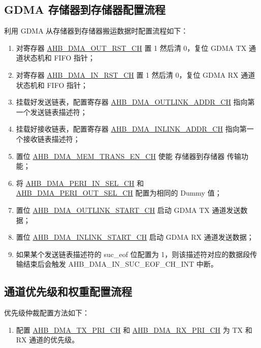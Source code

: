 \documentclass[main\_\_CN.tex]{subfiles}
\begin{document}
\subsection{GDMA 存储器到存储器配置流程}
利用 GDMA 从存储器到存储器搬运数据时配置流程如下：
\begin{enumerate}
    \item 对寄存器 \hyperref[fielddesc:AHBDMAOUTRSTCHN]{AHB\_DMA\_OUT\_RST\_CH} 置 1 然后清 0，复位 GDMA TX 通道状态机和 FIFO 指针；
    \item 对寄存器 \hyperref[fielddesc:AHBDMAINRSTCHN]{AHB\_DMA\_IN\_RST\_CH} 置 1 然后清 0，复位 GDMA RX 通道状态机和 FIFO 指针；
    \item 挂载好发送链表，配置寄存器 \hyperref[fielddesc:AHBDMAOUTLINKADDRCHN]{AHB\_DMA\_OUTLINK\_ADDR\_CH} 指向第一个发送链表描述符；
    \item 挂载好接收链表，配置寄存器 \hyperref[fielddesc:AHBDMAINLINKADDRCHN]{AHB\_DMA\_INLINK\_ADDR\_CH} 指向第一个接收链表描述符；
    \item 置位 \hyperref[fielddesc:AHBDMAMEMTRANSENCHN]{AHB\_DMA\_MEM\_TRANS\_EN\_CH} 使能 存储器到存储器 传输功能；
    \item 将 \hyperref[fielddesc:AHBDMAPERIINSELCHN]{AHB\_DMA\_PERI\_IN\_SEL\_CH} 和 \hyperref[fielddesc:AHBDMAPERIOUTSELCHN]{AHB\_DMA\_PERI\_OUT\_SEL\_CH} 配置为相同的 Dummy 值；
    \item 置位 \hyperref[fielddesc:AHBDMAOUTLINKSTARTCHN]{AHB\_DMA\_OUTLINK\_START\_CH} 启动 GDMA TX 通道发送数据；
    \item 置位 \hyperref[fielddesc:AHBDMAINLINKSTARTCHN]{AHB\_DMA\_INLINK\_START\_CH} 启动 GDMA RX 通道发送数据；
    \item 如果某个发送链表描述符的 suc\_eof 位配置为 1，则该描述符对应的数据段传输结束后会触发 AHB\_DMA\_IN\_SUC\_EOF\_CH\_INT 中断。
\end{enumerate}

\subsection{通道优先级和权重配置流程}

优先级仲裁配置方法如下：
\begin{enumerate}
\item  配置 \hyperref[fielddesc:AHBDMATXPRICHN]{AHB\_DMA\_TX\_PRI\_CH} 和 \hyperref[fielddesc:AHBDMARXPRICHN]{AHB\_DMA\_RX\_PRI\_CH} 为 TX 和 RX 通道的优先级。
\end{enumerate}
\end{document}
